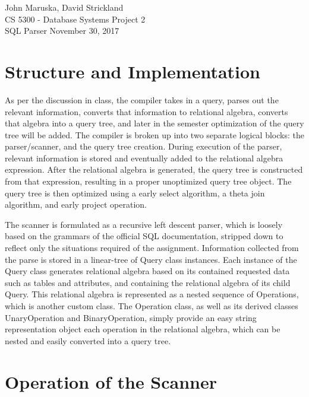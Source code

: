 \documentclass[]{article}
\begin{document}
	\noindent John Maruska, David Strickland \\
	CS 5300 - Database Systems \hfill Project 2 \\
	SQL Parser \hfill November 30, 2017
	
	\noindent\hrulefill 
	\doublespacing

	\section{Structure and Implementation}
	
	As per the discussion in class, the compiler takes in a query, parses out the relevant information, converts that information to relational algebra, converts that algebra into a query tree, and later in the semester optimization of the query tree will be added. The compiler is broken up into two separate logical blocks: the parser/scanner, and the query tree creation. During execution of the parser, relevant information is stored and eventually added to the relational algebra expression. After the relational algebra is generated, the query tree is constructed from that expression, resulting in a proper unoptimized query tree object. The query tree is then optimized using a early select algorithm, a theta join algorithm, and early project operation.
	
	The scanner is formulated as a recursive left descent parser, which is loosely based on the grammars of the official SQL documentation, stripped down to reflect only the situations required of the assignment. Information collected from the parse is stored in a linear-tree of Query class instances. Each instance of the Query class generates relational algebra based on its contained requested data such as tables and attributes, and containing the relational algebra of its child Query. This relational algebra is represented as a nested sequence of Operations, which is another custom class. The Operation class, as well as its derived classes UnaryOperation and BinaryOperation, simply provide an easy string representation object each operation in the relational algebra, which can be nested and easily converted into a query tree. 

	
	\section{Operation of the Scanner}
	
\end{document}
